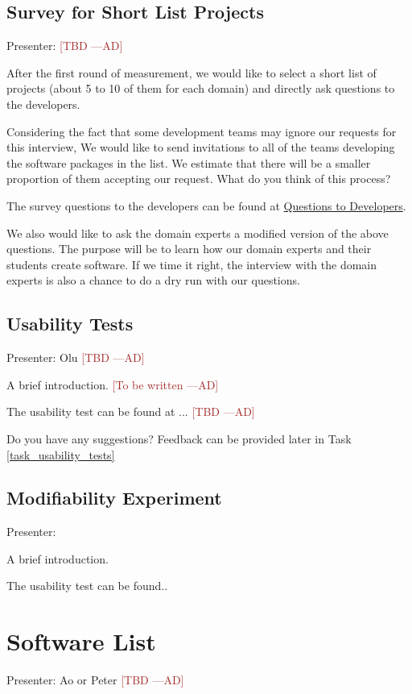 \documentclass[12pt]{article}
\newcommand{\authornote}[3]{\textcolor{#1}{[#3 ---#2]}}
\newcommand{\authornote}[3]{}
\newcommand{\ad}[1]{\authornote{brown}{AD}{#1}} %
\begin{document}
\subsection{Survey for Short List Projects}
\label{survey_short_list_projects}
Presenter: \ad{TBD}

After the first round of measurement, we would like to select a short list of
projects (about 5 to 10 of them for each domain) and directly ask questions to the
developers.

Considering the fact that some development teams may ignore our requests for
this interview, We would like to send invitations to all of the teams developing
the software packages in the list. We estimate that there will be a smaller
proportion of them accepting our request. What do you think of
this process?

The survey questions to the developers can be found at
\href{https://github.com/smiths/AIMSS/blob/master/StateOfPractice/Methodology/Questions%20to%20Developers.pdf}{Questions
	to Developers}.

We also would like to ask the domain experts a modified version of the above
questions. The purpose will be to learn how our domain experts and their
students create software. If we time it right, the interview with the domain
experts is also a chance to do a dry run with our questions.

\subsection{Usability Tests}
\label{usability_tests}
Presenter: Olu \ad{TBD}

A brief introduction. \ad{To be written}

The usability test can be found at ... \ad{TBD}

Do you have any suggestions? Feedback can be provided later in Task
\ref{task_usability_tests}

\subsection{Modifiability Experiment}
\label{modifiability_experiment}
Presenter:

A brief introduction. 

The usability test can be found..

\section{Software List}
Presenter: Ao or Peter \ad{TBD}
\end{document}
